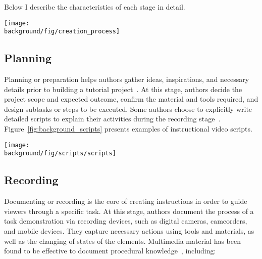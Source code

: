 Below I describe the characteristics of each stage in detail.

\begin{figure*}[h!]
  \centering
  \texttt{[image: \\background/fig/creation\_process]}
  \caption{A common workflow of tutorial creation, which includes planning the task in detail, recording the process, editing the captured content into a readable form, and sharing with the communities.}
  \label{fig:background_creation}
\end{figure*}


\subsection{Planning}
Planning or preparation helps authors gather ideas, inspirations, and necessary details prior to building a tutorial project~\cite{Torrey:2007he}. At this stage, authors decide the project scope and expected outcome, confirm the material and tools required, and design subtasks or steps to be executed. Some authors choose to explicitly write detailed scripts to explain their activities during the recording stage~\cite{Chi:2013:DGC:2501988.2502052}. Figure~\ref{fig:background_scripts} presents examples of instructional video scripts.

\begin{figure*}[th!]
  \centering
  \texttt{[image: \\background/fig/scripts/scripts]}
  \caption{Example scripts for instructional videos about a) food safety~\protect\cite{WisconsinFoodSafetyScript} and b) cooking ~\protect\cite{SouthernIllinoisScript}. Each includes video shot(s) and narration, some with additional notes on the actions. High-level structure can also be specified, such as ``introduction'' and ``conclusion.''}
  \label{fig:background_scripts}
\end{figure*}

\subsection{Recording}
Documenting or recording is the core of creating instructions in order to guide viewers through a specific task. At this stage, authors document the process of a task demonstration via recording devices, such as digital cameras, camcorders, and mobile devices. They capture necessary actions using tools and materials, as well as the changing of states of the elements.
%
Multimedia material has been found to be effective to document procedural knowledge~\cite{Kuznetsov:2010:REA:1868914.1868950,Wakkary:2015:TAH:2702123.2702550}, including:

